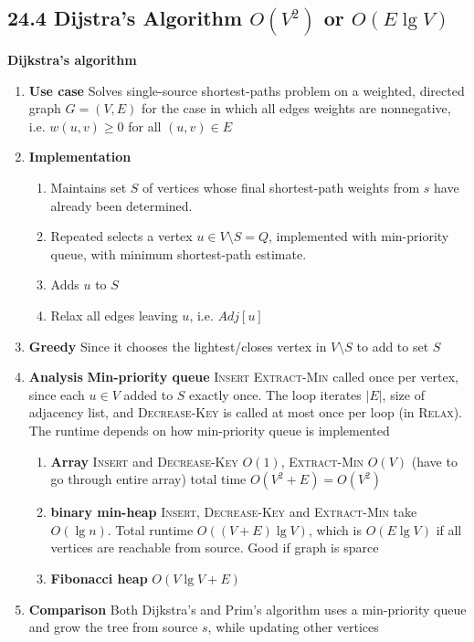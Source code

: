 \documentclass[11pt]{article}
\begin{document}
\subsection*{24.4 Dijstra's Algorithm $O(V^2)$ or $O(E\lg V)$}

\begin{defn*}
    \textbf{Dijkstra's algorithm}
    \begin{enumerate}
        \item \textbf{Use case} Solves single-source shortest-paths problem on a weighted, directed graph $G = (V,E)$ for the case in which all edges weights are nonnegative, i.e. $w(u,v) \geq 0$ for all $(u,v)\in E$
        \item \textbf{Implementation} 
        \begin{enumerate}
            \item Maintains set $S$ of vertices whose final shortest-path weights from $s$ have already been determined.
            \item Repeated selects a vertex $u\in V\setminus S = Q$, implemented with min-priority queue, with minimum shortest-path estimate. 
            \item Adds $u$ to $S$
            \item Relax all edges leaving $u$, i.e. $Adj[u]$
        \end{enumerate}
        \item \textbf{Greedy} Since it chooses the lightest/closes vertex in $V\setminus S$ to add to set $S$
        \item \textbf{Analysis} \textbf{Min-priority queue} \textsc{Insert} \textsc{Extract-Min} called once per vertex, since each $u\in V$ added to $S$ exactly once. The loop iterates $|E|$, size of adjacency list, and \textsc{Decrease-Key} is called at most once per loop (in \textsc{Relax}). The runtime depends on how min-priority queue is implemented 
        \begin{enumerate}
            \item \textbf{Array} \textsc{Insert} and \textsc{Decrease-Key} $O(1)$, \textsc{Extract-Min} $O(V)$ (have to go through entire array) total time $O(V^2 + E) = O(V^2)$
            \item \textbf{binary min-heap} \textsc{Insert}, \textsc{Decrease-Key} and \textsc{Extract-Min} take $O(\lg n)$. Total runtime $O((V+E)\lg V)$, which is $O(E\lg V)$ if all vertices are reachable from source. Good if graph is sparce
            \item \textbf{Fibonacci heap} $O(V\lg V + E)$
        \end{enumerate}
        \item \textbf{Comparison} Both Dijkstra's and Prim's algorithm uses a min-priority queue and grow the tree from source $s$, while updating other vertices
    \end{enumerate}
\end{defn*}
\end{document}
